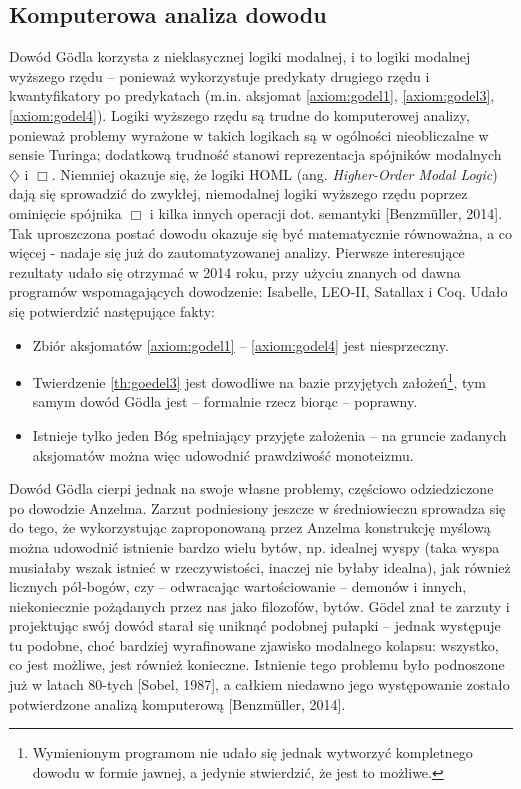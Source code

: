 \documentclass[12pt]{article}
\begin{document}
\begin{multicols}{2}
\section{Komputerowa analiza dowodu}
Dowód G\"odla korzysta z nieklasycznej logiki modalnej, i to logiki modalnej wyższego rzędu -- ponieważ wykorzystuje predykaty drugiego rzędu i kwantyfikatory po predykatach (m.in. aksjomat \ref{axiom:godel1}, \ref{axiom:godel3}, \ref{axiom:godel4}). Logiki wyższego rzędu są trudne do komputerowej analizy, ponieważ problemy wyrażone w takich logikach są w ogólności nieobliczalne w sensie Turinga; dodatkową trudność stanowi reprezentacja spójników modalnych $\diamondsuit$ i $\Box$. Niemniej okazuje się, że logiki HOML (ang. \textit{Higher-Order Modal Logic}) dają się sprowadzić do zwykłej, niemodalnej logiki wyższego rzędu poprzez ominięcie spójnika $\Box$ i kilka innych operacji dot. semantyki [Benzm\"uller, 2014]. Tak uproszczona postać dowodu okazuje się być matematycznie równoważna, a co więcej - nadaje się już do zautomatyzowanej analizy. Pierwsze interesujące rezultaty udało się otrzymać w 2014 roku, przy użyciu znanych od dawna programów wspomagających dowodzenie: Isabelle, LEO-II, Satallax i Coq. Udało się potwierdzić następujące fakty:
\begin{itemize}
	\item Zbiór aksjomatów \ref{axiom:godel1} -- \ref{axiom:godel4} jest niesprzeczny. 
	\item Twierdzenie \ref{th:goedel3} jest dowodliwe na bazie przyjętych założeń\footnote{Wymienionym programom nie udało się jednak wytworzyć kompletnego dowodu w formie jawnej, a jedynie stwierdzić, że jest to możliwe. }, tym samym dowód G\"odla jest -- formalnie rzecz biorąc -- poprawny.
	\item Istnieje tylko jeden Bóg spełniający przyjęte założenia -- na  gruncie zadanych aksjomatów można więc udowodnić prawdziwość monoteizmu. 
\end{itemize}

Dowód G\"odla cierpi jednak na swoje własne problemy, częściowo odziedziczone po dowodzie Anzelma. Zarzut podniesiony jeszcze w średniowieczu sprowadza się do tego, że wykorzystując zaproponowaną przez Anzelma konstrukcję myślową można udowodnić istnienie bardzo wielu bytów, np. idealnej wyspy (taka wyspa musiałaby wszak istnieć w rzeczywistości, inaczej nie byłaby idealna), jak również licznych pół-bogów, czy -- odwracając wartościowanie -- demonów i innych, niekoniecznie pożądanych przez nas jako filozofów, bytów. G\"odel znał te zarzuty i projektując swój dowód starał się uniknąć podobnej pułapki -- jednak występuje tu podobne, choć bardziej wyrafinowane zjawisko modalnego kolapsu: wszystko, co jest możliwe, jest również konieczne. Istnienie tego problemu było podnoszone już w latach 80-tych [Sobel, 1987], a całkiem niedawno jego występowanie zostało potwierdzone analizą komputerową [Benzm\"uller, 2014]. 


\end{multicols}
\end{document}
